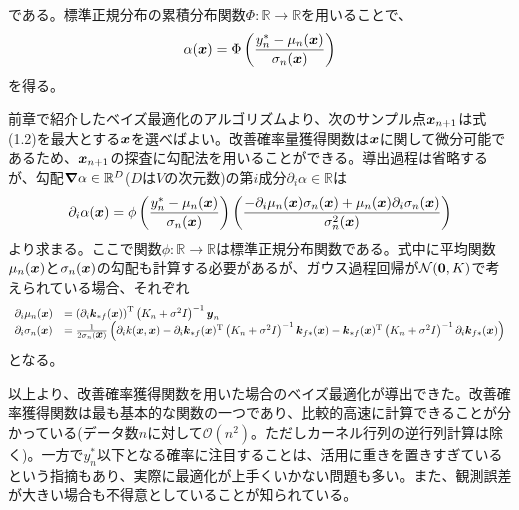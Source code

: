 \documentclass[dvipdfmx, 9pt, a4paper]{jsarticle}
\numberwithin{equation}{section}
\newcommand{\bm}[1]{{\mbox{\boldmath $#1$}}}
\newcommand{\bnabla}{\bm \nabla}
\begin{document}
である。標準正規分布の累積分布関数$\Phi:\mathbb{R} \to \mathbb{R}$を用いることで、
\begin{equation}
\alpha(\bm x)=\Phi\left( \frac{y^*_n-\mu_n(\bm x)}{\sigma_n(\bm x)} \right)
\end{equation}
を得る。\par
前章で紹介したベイズ最適化のアルゴリズムより、次のサンプル点$\bm x_{n+1}$は式(1.2)を最大とする$\bm x$を選べばよい。改善確率量獲得関数は$\bm x$に関して微分可能であるため、$\bm x_{n+1}$の探査に勾配法を用いることができる。導出過程は省略するが、勾配${\bnabla}\alpha \in \mathbb{R}^D$($D$は$V$の次元数)の第$i$成分$\partial_i\alpha \in \mathbb{R}$は
\begin{equation}
\partial_i\alpha(\bm x)=\phi\left( \frac{y^*_n-\mu_n(\bm x)}{\sigma_n(\bm x)} \right)
\left(\frac{-\partial_i\mu_n(\bm x)\sigma_n(\bm x)+\mu_n(\bm x)\partial_i\sigma_n(\bm x)}{\sigma^2_n(\bm x)}
\right)
\end{equation}
より求まる。ここで関数$\phi:\mathbb{R} \to \mathbb{R}$は標準正規分布関数である。式中に平均関数$\mu_n(\bm x)$と$\sigma_n(\bm x)$の勾配も計算する必要があるが、ガウス過程回帰が$\mathcal{N}(\bm 0, K)$で考えられている場合、それぞれ
\begin{equation}
\begin{array}{ll}
\partial_i\mu_n(\bm x)&=\left(\partial_i\bm k_{*f}(\bm x)\right)^{\rm T}\left(K_n+\sigma^2I\right)^{-1}\bm y_n \\
\partial_i\sigma_n(\bm x)&=\frac{1}{2\sigma_n(\bm x)}\left(\partial_ik(\bm x, \bm x) - \partial_i\bm k_{*f}(\bm x)^{\rm T}\left(K_n+\sigma^2I\right)^{-1}\bm k_{f*}(\bm x) - \bm k_{*f}(\bm x)^{\rm T}\left(K_n+\sigma^2I\right)^{-1}\partial_i\bm k_{f*}(\bm x)\right)
\end{array}
\end{equation}
となる。\par
以上より、改善確率獲得関数を用いた場合のベイズ最適化が導出できた。改善確率獲得関数は最も基本的な関数の一つであり、比較的高速に計算できることが分かっている(データ数$n$に対して$\mathcal{O}(n^2)$。ただしカーネル行列の逆行列計算は除く)。一方で$y^*_n$以下となる確率に注目することは、活用に重きを置きすぎているという指摘もあり、実際に最適化が上手くいかない問題も多い。また、観測誤差が大きい場合も不得意としていることが知られている。
\end{document}
